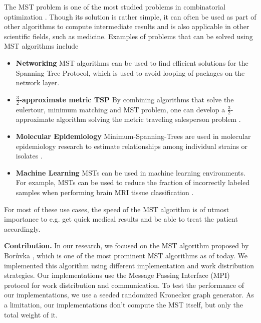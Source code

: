 \documentclass[letterpaper]{article}
\newcommand{\mypar}[1]{{\bf #1.}}
\begin{document}
The MST problem is one of the most studied problems in combinatorial optimization \cite{graham1985history}. Though its
solution is rather simple, it can often be used as part of other algorithms to compute intermediate results and is also
applicable in other scientific fields, such as medicine. Examples of problems that can be solved using MST algorithms
include
\begin{itemize}
  \item \textbf{Networking} MST algorithms can be used to find efficient solutions for the Spanning Tree Protocol, which
    is used to avoid looping of packages on the network layer.
  \item \textbf{$\frac{3}{2}$-ap\-prox\-i\-mate metric TSP} By combining algorithms that solve the eulertour, minimum
    matching and MST problem, one can develop a $\frac{3}{2}$-ap\-prox\-i\-mate algorithm solving the metric traveling
    salesperson problem \cite{christofides1976worst}.
  \item \textbf{Molecular Epidemiology} Minimum-Spanning-Trees are used in molecular epidemiology research to estimate
    relationships among individual strains or isolates \cite{spada2004use, salipante2011inadequacies}.
  \item \textbf{Machine Learning} MSTs can be used in machine learning environments. For example, MSTs can be used to
    reduce the fraction of incorrectly labeled samples when performing brain MRI tissue classification
    \cite{cocosco2003fully}.
\end{itemize}
For most of these use cases, the speed of the MST algorithm is of utmost importance to e.g. get quick medical results
and be able to treat the patient accordingly.

\mypar{Contribution}
In our research, we focused on the MST algorithm proposed by Bor\r{u}vka \cite{boruuvka1926jistem,
nevsetvril2001otakar}, which is one of the most prominent MST algorithms as of today. We implemented this algorithm
using different implementation and work distribution strategies. Our implementations use the Message Passing Interface
(MPI) protocol for work distribution and communication. To test the performance of our implementations, we use a seeded
randomized Kronecker graph generator.
As a limitation, our implementations don't compute the MST itself, but only the total weight of it.
\end{document}
